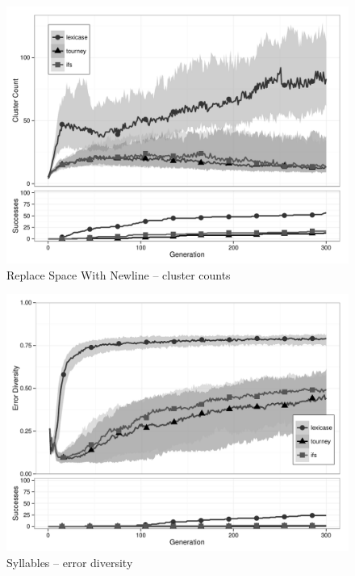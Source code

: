 \begin{figure}[p] %
\centering
\includegraphics[width=11.5cm]{replace-space-with-newline-cluster.pdf}
\caption{Replace Space With Newline -- cluster counts}
\label{rswnClu}
\end{figure}

\begin{figure}[p] %
\centering
\includegraphics[width=11.5cm]{syllables-diversity.pdf}
\caption{Syllables -- error diversity}
\label{syllablesDiv}
\end{figure}

